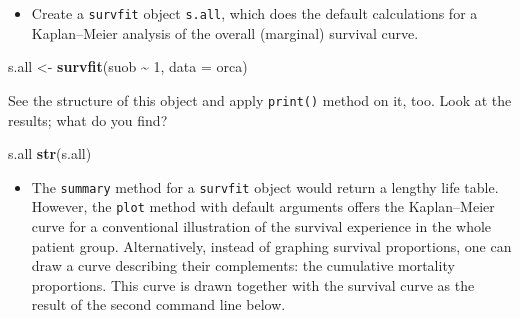 \documentclass[
]{book}
\newenvironment{Shaded}{\begin{snugshade}}{\end{snugshade}}
\newcommand{\AttributeTok}[1]{\textcolor[rgb]{0.13,0.29,0.53}{#1}}
\newcommand{\DecValTok}[1]{\textcolor[rgb]{0.00,0.00,0.81}{#1}}
\newcommand{\FunctionTok}[1]{\textcolor[rgb]{0.13,0.29,0.53}{\textbf{#1}}}
\newcommand{\NormalTok}[1]{#1}
\newcommand{\OtherTok}[1]{\textcolor[rgb]{0.56,0.35,0.01}{#1}}
\newcommand{\SpecialCharTok}[1]{\textcolor[rgb]{0.81,0.36,0.00}{\textbf{#1}}}
\providecommand{\tightlist}{%
  \setlength{\itemsep}{0pt}\setlength{\parskip}{0pt}}
\begin{document}
\begin{Shaded}
\end{Shaded}

\begin{itemize}
\tightlist
\item
  Create a \texttt{survfit} object \texttt{s.all}, which does the default calculations
  for a Kaplan--Meier analysis of the overall (marginal) survival curve.
\end{itemize}

\begin{Shaded}
\begin{Highlighting}[]
\NormalTok{s.all }\OtherTok{\textless{}{-}} \FunctionTok{survfit}\NormalTok{(suob }\SpecialCharTok{\textasciitilde{}} \DecValTok{1}\NormalTok{, }\AttributeTok{data =}\NormalTok{ orca)}
\end{Highlighting}
\end{Shaded}

See the structure of this object and apply \texttt{print()} method on it, too.
Look at the results; what do you find?

\begin{Shaded}
\begin{Highlighting}[]
\NormalTok{s.all}
\FunctionTok{str}\NormalTok{(s.all)}
\end{Highlighting}
\end{Shaded}

\begin{itemize}
\tightlist
\item
  The \texttt{summary} method for a \texttt{survfit} object would return a lengthy
  life table. However, the \texttt{plot} method with default arguments offers
  the Kaplan--Meier curve for a conventional illustration of the
  survival experience in the whole patient group. Alternatively, instead
  of graphing survival proportions, one can draw a curve describing
  their complements: the cumulative mortality proportions. This curve is
  drawn together with the survival curve as the result of the second
  command line below.
\end{itemize}
\end{document}

